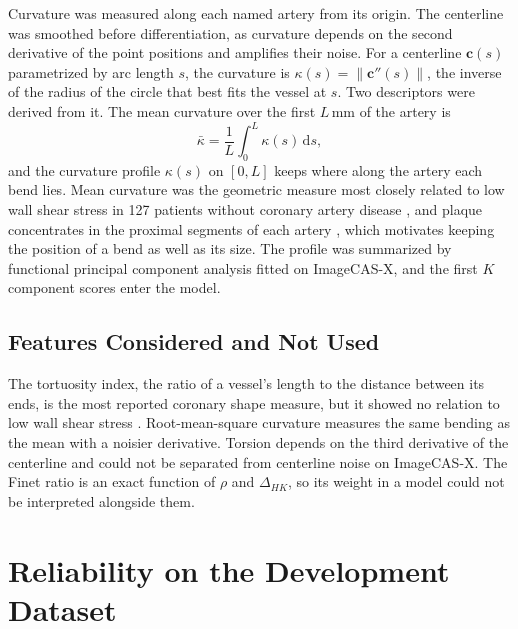 Curvature was measured along each named artery from its origin.
The centerline was smoothed before differentiation, as curvature depends on the second derivative
of the point positions and amplifies their noise.
For a centerline $\mathbf{c}(s)$ parametrized by arc length $s$, the curvature is
$\kappa(s) = \lVert \mathbf{c}''(s) \rVert$, the inverse of the radius of the circle that best fits
the vessel at $s$.
Two descriptors were derived from it.
The mean curvature over the first $L$\,mm of the artery is
\begin{equation}
  \bar\kappa = \frac{1}{L}\int_0^L \kappa(s)\,\mathrm{d}s,
  \label{eq:method-kappa}
\end{equation}
and the curvature profile $\kappa(s)$ on $[0, L]$ keeps where along the artery each bend lies.
Mean curvature was the geometric measure most closely related to low wall shear stress in 127
patients without coronary artery disease \cite{kashyap2022tortuosity}, and plaque concentrates in
the proximal segments of each artery \cite{araki2020plaques}, which motivates keeping the position
of a bend as well as its size.
The profile was summarized by functional principal component analysis fitted on ImageCAS-X, and the
first $K$ component scores enter the model.

\subsection{Features Considered and Not Used}
\label{sec:method-dropped}

The tortuosity index, the ratio of a vessel's length to the distance between its ends, is the most
reported coronary shape measure, but it showed no relation to low wall shear stress
\cite{kashyap2022tortuosity}.
Root-mean-square curvature measures the same bending as the mean with a noisier derivative.
Torsion depends on the third derivative of the centerline and could not be separated from
centerline noise on ImageCAS-X.
The Finet ratio \cite{finet2008fractal} is an exact function of $\rho$ and $\Delta_{HK}$, so its
weight in a model could not be interpreted alongside them.


\section{Reliability on the Development Dataset}
\label{sec:method-reliability}


